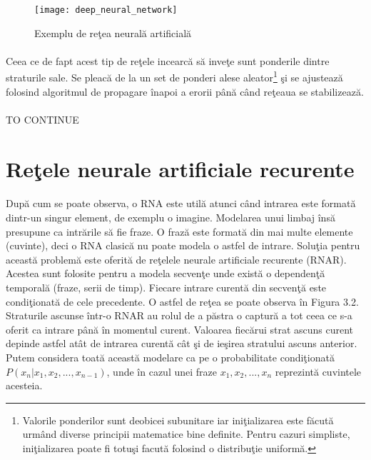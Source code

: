 \begin{figure}[H]
\centering
\texttt{[image: deep\_neural\_network]}
\caption{Exemplu de re\c tea neural\u a artificial\u a}
\end{figure}

\paragraph{}
Ceea ce de fapt acest tip de re\c tele incearc\u a s\u a inve\c te sunt ponderile dintre straturile sale. Se pleac\u a de la un set de ponderi alese aleator\footnote{Valorile ponderilor sunt deobicei subunitare iar ini\c tializarea este f\u acut\u a urm\^ and diverse principii matematice bine definite. Pentru cazuri simpliste, ini\c tializarea poate fi totu\c si facut\u a folosind o distribu\c tie uniform\u a.} \c si se ajusteaz\u a folosind algoritmul de propagare \^ inapoi a erorii p\^ an\u a c\^and re\c teaua se stabilizeaz\u a. 

\paragraph{}
TO CONTINUE

\section{Re\c tele neurale artificiale recurente}

\paragraph{}
Dup\u a cum se poate observa, o RNA este util\u a atunci c\^ and intrarea este format\u a dintr-un singur element, de exemplu o imagine. Modelarea unui limbaj \^ ins\u a presupune ca intr\u arile s\u a fie fraze. O fraz\u a este format\u a din mai multe elemente (cuvinte), deci o RNA clasic\u a nu poate modela o astfel de intrare. Solu\c tia pentru aceast\u a problem\u a este oferit\u a de re\c telele neurale artificiale recurente (RNAR). Acestea sunt folosite pentru a modela secven\c te unde exist\u a o dependen\c t\u a temporal\u a (fraze, serii de timp). Fiecare intrare curent\u a din secven\c t\u a este condi\c tionat\u a de cele precedente. O astfel de re\c tea se poate observa \^ in Figura 3.2. Straturile ascunse \^ intr-o RNAR au rolul de a p\u astra o captur\u a a tot ceea ce s-a oferit ca intrare p\^ an\u a \^ in momentul curent. Valoarea fiec\u arui strat ascuns curent depinde astfel at\^ at de intrarea curent\u a c\^ at \c si de ie\c sirea stratului ascuns anterior. Putem considera toat\u a aceast\u a modelare ca pe o probabilitate condi\c tionat\u a \( P(x_{n} | x_{1}, x_{2},..., x_{n-1}) \), unde \^ in cazul unei fraze \(x_{1}, x_{2},..., x_{n}\) reprezint\u a cuvintele acesteia. 

